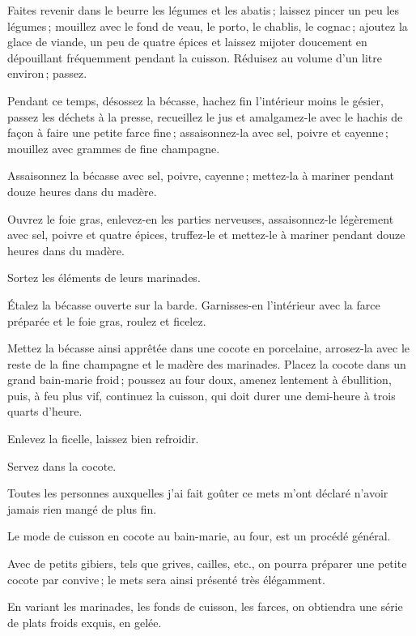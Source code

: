 Faites revenir dans le beurre les légumes et les abatis ; laissez pincer un peu
les légumes ; mouillez avec le fond de veau, le porto, le chablis, le cognac ;
ajoutez la glace de viande, un peu de quatre épices et laissez mijoter
doucement en dépouillant fréquemment pendant la cuisson. Réduisez au volume
d'un litre environ ; passez.

Pendant ce temps, désossez la bécasse, hachez fin l'intérieur moins le gésier,
passez les déchets à la presse, recueillez le jus et amalgamez-le avec le
hachis de façon à faire une petite farce fine ; assaisonnez-la avec sel, poivre
et cayenne ; mouillez avec {\mmm} grammes de fine champagne.

Assaisonnez la bécasse avec sel, poivre, cayenne ; mettez-la à mariner pendant
douze heures dans du madère.

Ouvrez le foie gras, enlevez-en les parties nerveuses, assaisonnez-le
légèrement avec sel, poivre et quatre épices, truffez-le et mettez-le à mariner
pendant douze heures dans du madère.

Sortez les éléments de leurs marinades.

Étalez la bécasse ouverte sur la barde. Garnisses-en l'intérieur avec la farce
préparée et le foie gras, roulez et ficelez.

Mettez la bécasse ainsi apprêtée dans une cocote en porcelaine, arrosez-la avec
le reste de la fine champagne et le madère des marinades. Placez la cocote dans
un grand bain-marie froid ; poussez au four doux, amenez lentement
à ébullition, puis, à feu plus vif, continuez la cuisson, qui doit durer une
demi-heure à trois quarts d'heure.

Enlevez la ficelle, laissez bien refroidir.

Servez dans la cocote.

Toutes les personnes auxquelles j'ai fait goûter ce mets m'ont déclaré n'avoir
jamais rien mangé de plus fin.

\medskip

Le mode de cuisson en cocote au bain-marie, au four, est un procédé général.

Avec de petits gibiers, tels que grives, cailles, etc., on pourra préparer une
petite cocote par convive ; le mets sera ainsi présenté très élégamment.

\sk

En variant les marinades, les fonds de cuisson, les farces, on obtiendra une
série de plats froids exquis, en gelée.

